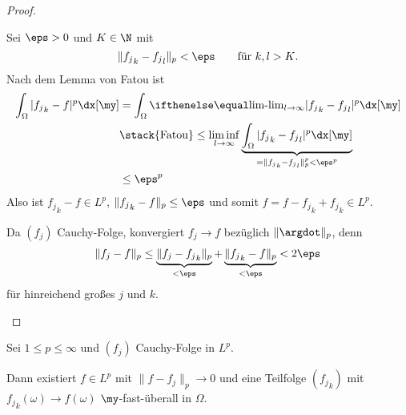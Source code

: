 \begin{st}
\begin{proof}
\begin{seg}[$1 \le p < \infty$]
\begin{enumerate}[a)]
					Sei $\eps > 0$ und $K \in \N$ mit
					\[
						\|{f_j}_k - {f_j}_l \|_p < \eps  \qquad \text{für $k,l > K$.}
					\]
					Nach dem Lemma von Fatou ist
					\begin{align*}
						\int_{\Omega} |{f_j}_k - f|^p \dx[\my]
						&= \int_{\Omega} \lim_{l\to \infty} |{f_j}_k - {f_j}_l |^p \dx[\my] \\
						&\stack{\text{Fatou}}\le \liminf_{l\to \infty} \underbrace{\int_{\Omega} |{f_j}_k - {f_j}_l |^p \dx[\my]}_{= \|{f_j}_k - {f_j}_l\|_p^p < \eps^p} \\
						&\le \eps^p
					\end{align*}
					Also ist ${f_j}_k - f \in L^p$, $\|{f_j}_k - f\|_p \le \eps$ und somit $f = f - {f_j}_k + {f_j}_k \in L^p$.

					Da $(f_j)$ Cauchy-Folge, konvergiert $f_j \to f$ bezüglich $\|\argdot\|_p$, denn
					\[
						\|f_j - f\|_p
						\le \underbrace{\|f_j - {f_j}_k \|_p}_{< \eps} + \underbrace{\|{f_j}_k - f\|_p}_{< \eps}
						< 2 \eps
					\]
					für hinreichend großes $j$ und $k$.
			\end{enumerate}
		\end{seg}
	\end{proof}
\end{st}
\setcounter{thm}{13}
\begin{kor}[Weyl] \label{2.14}
	Sei $1 \le p \le \infty$ und $(f_j)$ Cauchy-Folge in $L^p$.

	Dann existiert $f \in L^p$ mit $\|f - f_j\|_p \to 0$ und eine Teilfolge $({f_j}_k)$ mit ${f_j}_k(\omega) \to f(\omega)$ $\my$-fast-überall in $\Omega$.
\end{kor}

